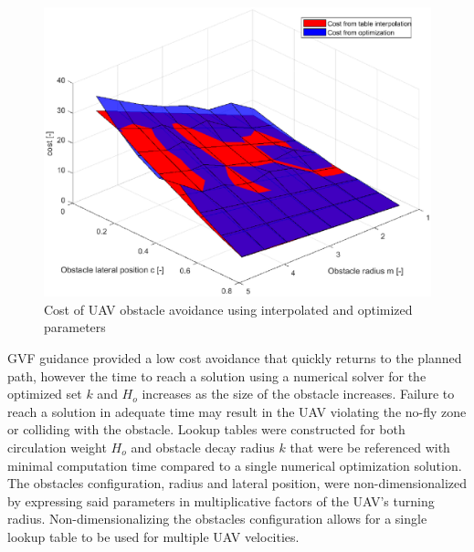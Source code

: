 \documentclass[numbered,pdftex]{ohio-etd}
\begin{document}
\begin{figure}[H]
	\centering
	\includegraphics[width=12cm]{PaperFigures/Methods/LookupTable/costPlanes}
	\caption{Cost of UAV obstacle avoidance using interpolated and optimized parameters}
	\label{fig:costplanes}
\end{figure}




%




GVF guidance provided a low cost avoidance that quickly returns to the planned path, however the time to reach a solution using a numerical solver for the optimized set $k$ and $H_o$ increases as the size of the obstacle increases. Failure to reach a solution in adequate time may result in the UAV violating the no-fly zone or colliding with the obstacle. Lookup tables were constructed for both circulation weight $H_o$ and obstacle decay radius $k$ that were be referenced with minimal computation time compared to a single numerical optimization solution. The obstacles configuration, radius and lateral position, were non-dimensionalized by expressing said parameters in multiplicative factors of the UAV's turning radius. Non-dimensionalizing the obstacles configuration allows for a single lookup table to be used for multiple UAV velocities. 
\end{document}
